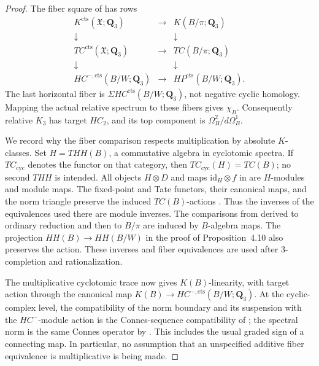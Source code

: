 \documentclass[11pt,a4paper]{article}
\theoremstyle{remark}
\begin{document}
\begin{proof}
The fiber square of \cite[Proposition~4.10]{AMMN} has rows
\[
\begin{matrix}
 K^{\mathrm{cts}}(\mathfrak X;\mathbf Q_3)
       &\longrightarrow&K(B/\pi;\mathbf Q_3)\\
 \downarrow&&\downarrow\\
 TC^{\mathrm{cts}}(\mathfrak X;\mathbf Q_3)
       &\longrightarrow&TC(B/\pi;\mathbf Q_3)\\
 \downarrow&&\downarrow\\
 HC^{-,\mathrm{cts}}(B/W;\mathbf Q_3)
       &\longrightarrow&HP^{\mathrm{cts}}(B/W;\mathbf Q_3).
\end{matrix}
\]
The last horizontal fiber is $\Sigma HC^{\mathrm{cts}}(B/W;\mathbf Q_3)$,
not negative cyclic homology. Mapping the actual relative spectrum to
these fibers gives $\chi_B$. Consequently relative $K_3$ has target
$HC_2$, and its top component is $\Omega_B^2/d\Omega_B^1$.

We record why the fiber comparison respects multiplication by absolute
$K$-classes. Set $H=THH(B)$, a commutative algebra in cyclotomic spectra.
If $TC_{\mathrm{cyc}}$ denotes the functor on that category, then
$TC_{\mathrm{cyc}}(H)=TC(B)$; no second $THH$ is intended.
All objects $H\otimes D$ and maps $\mathrm{id}_H\otimes f$ in
\cite[Proposition~2.8, Corollary~2.10, Theorem~2.12]{AMMN} are
$H$-modules and module maps. The fixed-point and Tate functors, their
canonical maps, and the norm triangle preserve the induced $TC(B)$-actions
\cite[Corollary~I.4.3]{NikolausScholze}. Thus the inverses of the
equivalences used there are module inverses. The comparisons from
derived to ordinary reduction and then to $B/\pi$ are induced by
$B$-algebra maps. The projection $HH(B)\to HH(B/W)$ in the proof of
Proposition~4.10 also preserves the action. These inverses and fiber
equivalences are used after $3$-completion and rationalization.

The multiplicative cyclotomic trace
\cite[Theorem~7.4]{BGTTrace} now gives $K(B)$-linearity, with target
action through the canonical map $K(B)\to HC^{-,\mathrm{cts}}(B/W;\mathbf Q_3)$.
At the cyclic-complex level, the compatibility of the norm boundary
and its suspension with the $HC^-$-module action is the Connes-sequence
compatibility of \cite[Proposition~2.3]{BokstedtOttosen}; the spectral norm is the same Connes operator by \cite[Theorem~2.1, Lemma~2.2, and Theorem~2.3]{HoyoisCircle}. This includes
the usual graded sign of a connecting map. In particular, no assumption
that an unspecified additive fiber equivalence is multiplicative is
being made.


\end{proof}
\end{document}

